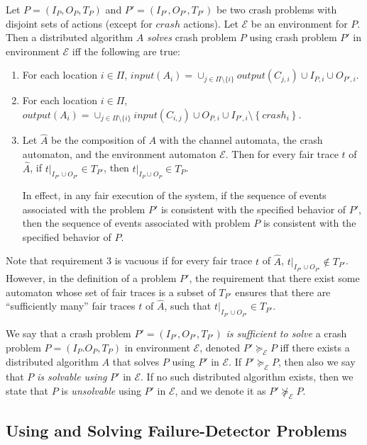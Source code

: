 \documentclass[11pt]{article}
\numberwithin{theorem}{section}
\newcommand{\stronger}{\succeq}
\newcommand{\set}[1]{\left\{#1\right\}}
\begin{document}
Let $P = (I_P,O_P,T_P)$ and $P' = (I_{P'}, O_{P'}, T_{P'})$ be two
crash problems with disjoint sets of actions (except for $crash$
actions).
Let $\mathcal{E}$ be an environment for $P$.
Then a distributed algorithm $A$ \emph{solves} crash problem $P$ using
crash problem $P'$ in environment $\mathcal{E}$ iff the following are
true:
\begin{enumerate}
\item
For each location $i \in \Pi$, $input(A_i) = \cup_{j\in \Pi \setminus \{i\}}output(C_{j,i}) \cup I_{P,i} \cup O_{P',i}$. 
\item
For each location $i \in \Pi$, $output(A_i) = \cup_{j\in \Pi \setminus
  \{i\}}input(C_{i,j}) \cup O_{P,i} \cup 
I_{P',i} \setminus \set{crash_i}$.
\item
Let $\hat{A}$ be the composition of $A$ with the channel automata,
the crash automaton, and the environment automaton $\mathcal{E}$. 
Then for every fair trace $t$ of $\hat{A}$, 
if $t|_{I_{P'} \cup O_{P'}} \in T_{P'}$, then $t|_{I_P \cup O_P} \in
T_P$. 

In effect, in any fair execution of the system, if the sequence
of events associated with the problem $P'$ is consistent with the
specified behavior of $P'$, then the sequence of events associated
with problem $P$ is consistent with the specified behavior of $P$.
\end{enumerate}

Note that requirement 3 is vacuous if for every fair trace $t$ of
$\hat{A}$, $t|_{I_{P'} \cup O_{P'}} \notin T_{P'}$. 
However, in the definition of a problem $P'$, the requirement
that there exist some automaton whose set of fair traces is a subset
of $T_{P'}$ ensures that there are ``sufficiently many'' fair traces $t$
of $\hat{A}$, such that $t|_{I_{P'} \cup O_{P'}} \in T_{P'}$.


We say that a crash problem $P' = (I_{P'},O_{P'},T_{P'})$ 
\emph{is sufficient to solve} a crash problem $P = (I_P.O_P,T_P)$
in environment $\mathcal{E}$, denoted $P' \stronger_\mathcal{E} P$ iff
there exists a distributed algorithm $A$ that solves $P$ using $P'$ in
$\mathcal{E}$. If $P' \stronger_\mathcal{E} P$, then also we say that
$P$ \emph{is solvable using} $P'$ in $\mathcal{E}$. If no such
distributed algorithm exists, then we state that $P$ is
\emph{unsolvable} using $P'$ in $\mathcal{E}$, and we denote it as $P'
\not\stronger_{\mathcal{E}} P$.

\subsection{Using and Solving Failure-Detector Problems}
\label{subsec:solvingFDproblemsWithAnother}
\end{document}
